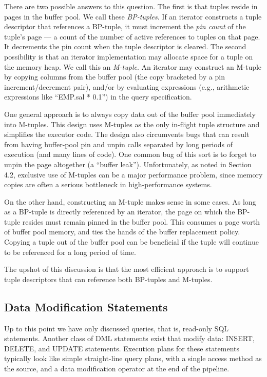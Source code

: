 \documentclass[a4paper,11pt,twoside,openright]{book}
\begin{document}
There are two possible answers to this question. The first is that
tuples reside in pages in the buffer pool. We call these
\emph{BP-tuples}. If an iterator constructs a tuple descriptor that
references a BP-tuple, it must
increment the \emph{pin count} of the tuple's page --- a count of the
number of active references to tuples on that page. It decrements the
pin count when the tuple descriptor is cleared. The second possibility
is that an iterator implementation may allocate space for a tuple on the
memory heap. We call this an \emph{M-tuple}. An iterator may construct
an M-tuple by copying columns from the buffer pool (the copy bracketed
by a pin increment/decrement pair), and/or by evaluating expressions
(e.g., arithmetic expressions like ``EMP.sal * 0.1'') in the
query specification.

One general approach is to always copy data out of the buffer pool
immediately into M-tuples. This design uses M-tuples as the only
in-flight tuple structure and simplifies the executor code. The design
also circumvents bugs that can result from having buffer-pool pin and
unpin calls separated by long periods of execution (and many lines of
code). One common bug of this sort is to forget to unpin the page
altogether (a ``buffer leak''). Unfortunately, as noted in Section 4.2,
exclusive use of M-tuples can be a major performance problem, since
memory copies are often a serious bottleneck in high-performance
systems.

On the other hand, constructing an M-tuple makes sense in some cases. As
long as a BP-tuple is directly referenced by an iterator, the page on
which the BP-tuple resides must remain pinned in the buffer pool. This
consumes a page worth of buffer pool memory, and ties the hands of the
buffer replacement policy. Copying a tuple out of the buffer pool can be
beneficial if the tuple will continue to be referenced for a long period
of time.

The upshot of this discussion is that the most efficient approach is to
support tuple descriptors that can reference both BP-tuples and
M-tuples.

\hypertarget{data-modification-statements}{%
\subsection{Data Modification
Statements}\label{data-modification-statements}}

Up to this point we have only discussed queries, that is, read-only SQL
statements. Another class of DML statements exist that modify data:
INSERT, DELETE, and UPDATE statements. Execution plans for these
statements typically look like simple straight-line query plans, with a
single access method as the source, and a data modification operator at
the end of the pipeline.
\end{document}
